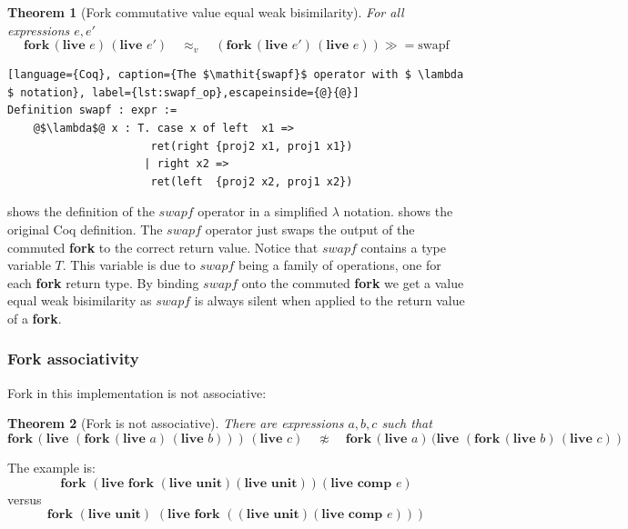 \documentclass[12pt,twoside,notitlepage]{report}
\theoremstyle{plain}%
\newtheorem{thm}{Theorem}[section]
\theoremstyle{definition}
\theoremstyle{remark}
\begin{document}
\begin{thm}[Fork commutative value equal weak bisimilarity]
For all expressions $ e, e'$
\[  \textbf{fork}\,(\textbf{live }e)\,(\textbf{live }e')\quad \approx_v \quad (\textbf{fork}\,(\textbf{live }e')\,(\textbf{live }e))\gg=\text{swapf} \]
\end{thm}

\begin{lstlisting}[language={Coq}, caption={The $\mathit{swapf}$ operator with $ \lambda $ notation}, label={lst:swapf_op},escapeinside={@}{@}]
Definition swapf : expr :=
    @$\lambda$@ x : T. case x of left  x1 => 
                      ret(right {proj2 x1, proj1 x1}) 
                     | right x2 =>
                      ret(left  {proj2 x2, proj1 x2}) 
\end{lstlisting}
 shows the definition of the $\mathit{swapf}$ operator in a simplified $ \lambda $ notation.  shows the original Coq definition. The $ \mathit{swapf} $ operator just swaps the output of the commuted \textbf{fork} to the correct return value. Notice that $ \mathit{swapf} $ contains a type variable $ T $. This variable is due to $ \mathit{swapf} $ being a family of operations, one for each \textbf{fork} return type. By binding $\mathit{swapf}$ onto the commuted \textbf{fork} we get a value equal weak bisimilarity as $\mathit{swapf}$ is always silent when applied to the return value of a \textbf{fork}.

\subsubsection{Fork associativity}
Fork in this implementation is not associative:

\begin{thm}[Fork is not associative]
There are expressions $a, b, c$ such that
\[  \textbf{fork}\,(\textbf{live }(\textbf{fork}\,(\textbf{live }a)\,(\textbf{live }b)))\,(\textbf{live }c)\quad \not\approx \quad \textbf{fork}\,(\textbf{live }a)\,(\textbf{live }(\textbf{fork}\,(\textbf{live }b)\,(\textbf{live }c)) \]
\end{thm}

The example is:
\[ \textbf{fork } (\textbf{live }\textbf{fork }(\textbf{live }\textbf{unit})  (\textbf{live }\textbf{unit}))  (\textbf{live }\textbf{comp } e) \tag{R-Assoc} \label{eq:fork_assoc_counter_r} \]
versus
\[ \textbf{fork } (\textbf{live }\textbf{unit})\,\,(\textbf{live }  \textbf{fork } ((\textbf{live }\textbf{unit})  (\textbf{live }\textbf{comp } e))) \tag{L-Assoc} \label{eq:fork_assoc_counter_l} \]
\end{document}
